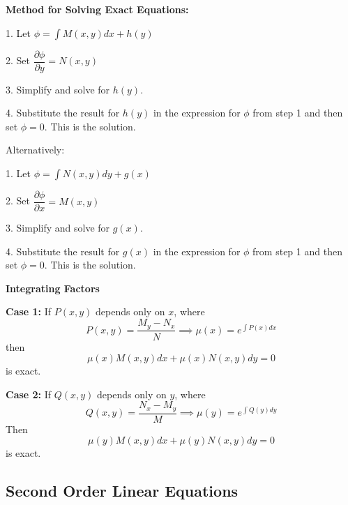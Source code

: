 \documentclass[10pt,leqno]{article}
\begin{document}
\begin{multicols}{2}
\textbf{Method for Solving Exact Equations:}

1. Let $\phi=\int M(x,y)dx + h(y)$

2. Set $\dfrac{\partial \phi}{\partial y} = N(x,y)$

3. Simplify and solve for $h(y)$. 

4. Substitute the result for $h(y)$ in the expression for $\phi$ from step 1 and then set $\phi=0$. This is the solution. 

Alternatively: 

1. Let $\phi=\int N(x,y)dy + g(x)$

2. Set $\dfrac{\partial \phi}{\partial x} = M(x,y)$

3. Simplify and solve for $g(x)$. 

4. Substitute the result for $g(x)$ in the expression for $\phi$ from step 1 and then set $\phi=0$. This is the solution. 

\textbf{Integrating Factors}

\textbf{Case 1:} If $P(x,y)$ depends only on $x$, where
\begin{equation}
P(x,y)=\dfrac{M_y-N_x}{N} \implies \mu(x) = e^{\int P(x)dx}
\end{equation}
then
\begin{equation}
\mu(x) M(x,y) dx + \mu(x) N(x,y) dy = 0
\end{equation}
is exact.

\textbf{Case 2:} If $Q(x,y)$ depends only on $y$, where
\begin{equation}
Q(x,y)=\dfrac{N_x-M_y}{M} \implies \mu(y) = e^{\int Q(y)dy}
\end{equation}
Then 
\begin{equation}
\mu(y) M(x,y) dx + \mu(y)N(x,y) dy =0
\end{equation}
is exact.

\end{multicols}

\newpage

 \begin{center}\section*{Second Order Linear Equations}
\end{center}
\end{document}
